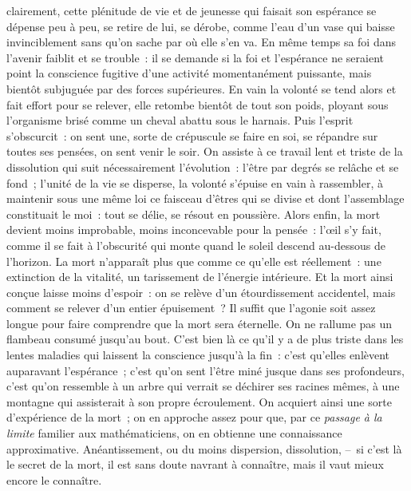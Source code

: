 \documentclass[french,twoside]{book} %
\begin{document}
clairement, cette plénitude de vie et de jeunesse qui faisait son espérance se dépense peu à peu, se retire de lui, se dérobe, comme l’eau d’un vase qui baisse invinciblement sans qu’on sache par où elle s’en va. En même temps sa foi dans l’avenir faiblit et se trouble : il se demande si la foi et l’espérance ne seraient point la conscience fugitive d’une activité momentanément puissante, mais bientôt subjuguée par des forces supérieures. En vain la volonté se tend alors et fait effort pour se relever, elle retombe bientôt de tout son poids, ployant sous l’organisme brisé comme un cheval abattu sous le harnais. Puis l’esprit s’obscurcit : on sent une, sorte de crépuscule se faire en soi, se répandre sur toutes ses pensées, on sent venir le soir. On assiste à ce travail lent et triste de la dissolution qui suit nécessairement l’évolution : l’être par degrés se relâche et se fond ; l’unité de la vie se disperse, la volonté s’épuise en vain à rassembler, à maintenir sous une même loi ce faisceau d’êtres qui se divise et dont l’assemblage constituait le moi : tout se délie, se résout en poussière. Alors enfin, la mort devient moins improbable, moins inconcevable pour la pensée : l’œil s’y fait, comme il se fait à l’obscurité qui monte quand le soleil descend au-dessous de l’horizon. La mort n’apparaît plus que comme ce qu’elle est réellement : une extinction de la vitalité, un tarissement de l’énergie intérieure. Et la mort ainsi conçue laisse moins d’espoir : on se relève d’un étourdissement accidentel, mais comment se relever d’un entier épuisement ? Il suffit que l’agonie soit assez longue pour faire comprendre que la mort sera éternelle. On ne rallume pas un flambeau consumé jusqu’au bout. C’est bien là ce qu’il y a de plus triste dans les lentes maladies qui laissent la conscience jusqu’à la fin : c’est qu’elles enlèvent auparavant l’espérance ; c’est qu’on sent l’être miné jusque dans ses profondeurs, c’est qu’on ressemble à un arbre qui verrait se déchirer ses racines mêmes, à une montagne qui assisterait à son propre écroulement. On acquiert ainsi une sorte d’expérience de la mort ; on en approche assez pour que, par ce \emph{passage à la limite} familier aux mathématiciens, on en obtienne une connaissance approximative. Anéantissement, ou du moins dispersion, dissolution, – si c’est là le secret de la mort, il est sans doute navrant à connaître, mais il vaut mieux encore le connaître.\par
\end{document}
